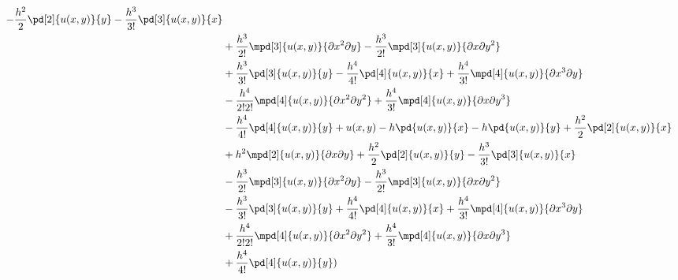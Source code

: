 \documentclass[11pt]{article}
\begin{document}
\begin{enumerate}
\begin{enumerate}
\begin{align*}
                    - \frac{h^2}{2}\pd[2]{u(x,y)}{y}
                    - \frac{h^3}{3!}\pd[3]{u(x,y)}{x} \\
                    &+ \frac{h^3}{2!} \mpd[3]{u(x,y)}{\partial x^2 \partial y}
                    - \frac{h^3}{2!} \mpd[3]{u(x,y)}{\partial x \partial y^2} \\
                    &+ \frac{h^3}{3!} \pd[3]{u(x,y)}{y}
                    - \frac{h^4}{4!} \pd[4]{u(x,y)}{x}
                    + \frac{h^4}{3!} \mpd[4]{u(x,y)}{\partial x^3 \partial y} \\
                    &- \frac{h^4}{2! 2!} \mpd[4]{u(x,y)}{\partial x^2 \partial y^2}
                    + \frac{h^4}{3!} \mpd[4]{u(x,y)}{\partial x \partial y^3} \\
                    &- \frac{h^4}{4!} \pd[4]{u(x,y)}{y}
                    + u(x,y) - h\pd{u(x,y)}{x} - h\pd{u(x,y)}{y}
                    + \frac{h^2}{2} \pd[2]{u(x,y)}{x} \\
                    &+ h^2\mpd[2]{u(x,y)}{\partial x \partial y}
                    + \frac{h^2}{2}\pd[2]{u(x,y)}{y}
                    - \frac{h^3}{3!}\pd[3]{u(x,y)}{x} \\
                    &- \frac{h^3}{2!} \mpd[3]{u(x,y)}{\partial x^2 \partial y}
                    - \frac{h^3}{2!} \mpd[3]{u(x,y)}{\partial x \partial y^2} \\
                    &- \frac{h^3}{3!} \pd[3]{u(x,y)}{y}
                    + \frac{h^4}{4!} \pd[4]{u(x,y)}{x}
                    + \frac{h^4}{3!} \mpd[4]{u(x,y)}{\partial x^3 \partial y} \\
                    &+ \frac{h^4}{2! 2!} \mpd[4]{u(x,y)}{\partial x^2 \partial y^2}
                    + \frac{h^4}{3!} \mpd[4]{u(x,y)}{\partial x \partial y^3} \\
                    &+ \frac{h^4}{4!} \pd[4]{u(x,y)}{y}) \\

\end{align*}
\end{enumerate}
\end{enumerate}
\end{document}
